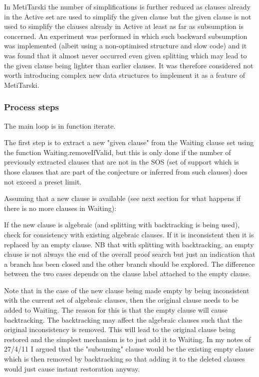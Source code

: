 \documentclass[11pt, oneside]{article}   	%
\begin{document}
In MetiTarski the number of simplifications is further reduced as clauses already in the Active set are used to simplify the given clause but the given clause is not used to simplify the clauses already
in Active at least as far as subsumption is concerned. An experiment was performed in which such backward subsumption was implemented (albeit using a non-optimised structure and slow code) and it was
found that it almost never occurred even given splitting which may lead to the given clause being lighter than earlier clauses. It was therefore considered not worth introducing complex new data structures to implement it
as a feature of MetiTarski.

\subsubsection{Process steps}
The main loop is in function iterate.

The first step is to extract a new "given clause" from the Waiting clause set using the function Waiting.removeIfValid, but this is only done if the number of previously extracted
clauses that are not in the SOS (set of support which is those clauses that are part of the conjecture or inferred from such clauses) does not exceed a preset limit.

Assuming that a new clause is available (see next section for what happens if there is no more clauses in Waiting):

If the new clause is algebraic (and splitting with backtracking is being used), check for consistency with existing algebraic clauses. If it is inconsistent then it is replaced by an empty clause.
NB that with splitting with backtracking, an empty clause is not always the end of the overall proof search but just an indication that a branch has been closed and the other branch should be
explored. The difference between the two cases depends on the clause label attached to the empty clause.

Note that in the case of the new clause being made empty by being inconsistent with the current set of algebraic clauses, then the original clause needs to be added to Waiting.
The reason for this is that the empty clause will cause backtracking. The backtracking may affect the algebraic clauses such that the original inconsistency is removed. This will lead to the original
clause being restored and the simplest mechanism is to just add it to Waiting. In my notes of 27/4/11 I argued that the "subsuming" clause would be the existing empty clause which is then removed by backtracking
so that adding it to the deleted clauses would just cause instant restoration anyway.
\end{document}
